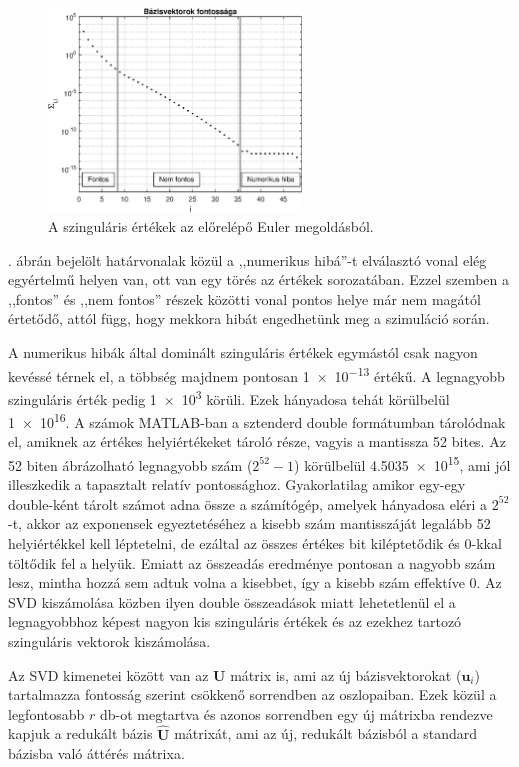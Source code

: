             \begin{figure}[h!]
                \centering
                \includegraphics[width=0.6\textwidth]{kep/euler_0.15_4_sv.eps}
                \caption{A szinguláris értékek az előrelépő Euler megoldásból.}
                \label{fig:sigma}
            \end{figure}
            . ábrán bejelölt határvonalak közül a ,,numerikus hibá''-t elválasztó vonal elég egyértelmű helyen van, ott van egy törés az értékek sorozatában. Ezzel szemben a ,,fontos'' és ,,nem fontos'' részek közötti vonal pontos helye már nem magától értetődő, attól függ, hogy mekkora hibát engedhetünk meg a szimuláció során.
            \par
            A numerikus hibák által dominált szinguláris értékek egymástól csak nagyon kevéssé térnek el, a többség majdnem pontosan \num{1e-13} értékű. A legnagyobb szinguláris érték pedig \num{1e3} körüli. Ezek hányadosa tehát körülbelül \num{1e16}. A számok MATLAB-ban a sztenderd double formátumban tárolódnak el, amiknek az értékes helyiértékeket tároló része, vagyis a mantissza 52 bites. Az 52 biten ábrázolható legnagyobb szám ($2^{52}-1$) körülbelül \num{4.5035e15}, ami jól illeszkedik a tapasztalt relatív pontossághoz. Gyakorlatilag amikor egy-egy double-ként tárolt számot adna össze a számítógép, amelyek hányadosa eléri a $2^{52}$-t, akkor az exponensek egyeztetéséhez a kisebb szám mantisszáját legalább 52 helyiértékkel kell léptetelni, de ezáltal az összes értékes bit kiléptetődik és 0-kkal töltődik fel a helyük. Emiatt az összeadás eredménye pontosan a nagyobb szám lesz, mintha hozzá sem adtuk volna a kisebbet, így a kisebb szám effektíve 0. Az SVD kiszámolása közben  ilyen double összeadások miatt lehetetlenül el a legnagyobbhoz képest nagyon kis szinguláris értékek és az ezekhez tartozó szinguláris vektorok kiszámolása.
            \par
            Az SVD kimenetei között van az $\textbf{U}$ mátrix is, ami az új bázisvektorokat ($\textbf{u}_i$) tartalmazza fontosság szerint csökkenő sorrendben az oszlopaiban. Ezek közül a legfontosabb $r$ db-ot megtartva és azonos sorrendben egy új mátrixba rendezve kapjuk a redukált bázis $\mathbf{\hat{U}}$ mátrixát, ami az új, redukált bázisból a standard bázisba való áttérés mátrixa.
